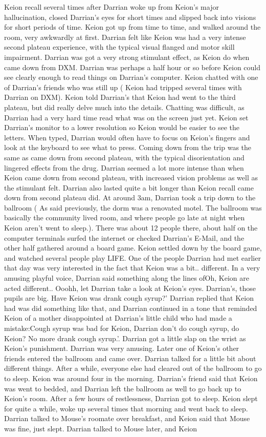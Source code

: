 \documentclass[12pt]{book}
\begin{document}
Keion recall several times after Darrian woke up from Keion's major hallucination, closed Darrian's eyes for short times and slipped back into visions for short periods of time. Keion got up from time to time, and walked around the room, very awkwardly at first. Darrian felt like Keion was had a very intense second plateau experience, with the typical visual flanged and motor skill impairment. Darrian was got a very strong stimulant effect, as Keion do when came down from DXM. Darrian was perhaps a half hour or so before Keion could see clearly enough to read things on Darrian's computer. Keion chatted with one of Darrian's friends who was still up ( Keion had tripped several times with Darrian on DXM). Keion told Darrian's that Keion had went to the third plateau, but did really delve much into the details. Chatting was difficult, as Darrian had a very hard time read what was on the screen just yet. Keion set Darrian's monitor to a lower resolution so Keion would be easier to see the letters. When typed, Darrian would often have to focus on Keion's fingers and look at the keyboard to see what to press. Coming down from the trip was the same as came down from second plateau, with the typical disorientation and lingered effects from the drug. Darrian seemed a lot more intense than when Keion came down from second plateau, with increased vision problems as well as the stimulant felt. Darrian also lasted quite a bit longer than Keion recall came down from second plateau did. At around 3am, Darrian took a trip down to the ballroom ( As said previously, the dorm was a renovated motel. The ballroom was basically the community lived room, and where people go late at night when Keion aren't went to sleep.). There was about 12 people there, about half on the computer terminals surfed the internet or checked Darrian's E-Mail, and the other half gathered around a board game. Keion settled down by the board game, and watched several people play LIFE. One of the people Darrian had met earlier that day was very interested in the fact that Keion was a bit.. different. In a very amusing playful voice, Darrian said something along the lines ofOh, Keion are acted different.. Ooohh, let Darrian take a look at Keion's eyes. Darrian's, those pupils are big. Have Keion was drank cough syrup?' Darrian replied that Keion had was did something like that, and Darrian continued in a tone that reminded Keion of a mother disappointed at Darrian's little child who had made a mistake:Cough syrup was bad for Keion, Darrian don't do cough syrup, do Keion? No more drank cough syrup.'. Darrian got a little slap on the wrist as Keion's punishment. Darrian was very amusing. Later one of Keion's other friends entered the ballroom and came over. Darrian talked for a little bit about different things. After a while, everyone else had cleared out of the ballroom to go to sleep. Keion was around four in the morning. Darrian's friend said that Keion was went to bedded, and Darrian left the ballroom as well to go back up to Keion's room. After a few hours of restlessness, Darrian got to sleep. Keion slept for quite a while, woke up several times that morning and went back to sleep. Darrian talked to Mouse's roomate over breakfast, and Keion said that Mouse was fine, just slept. Darrian talked to Mouse later, and Keion 
\end{document}
